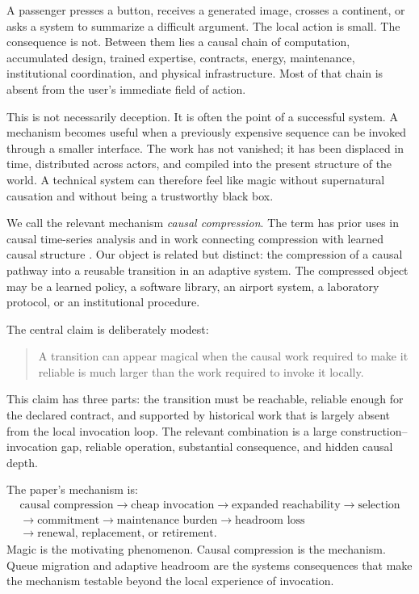 \documentclass[11pt]{article}
\begin{document}
A passenger presses a button, receives a generated image, crosses a continent, or asks a system to summarize a difficult argument. The local action is small. The consequence is not. Between them lies a causal chain of computation, accumulated design, trained expertise, contracts, energy, maintenance, institutional coordination, and physical infrastructure. Most of that chain is absent from the user's immediate field of action.

This is not necessarily deception. It is often the point of a successful system. A mechanism becomes useful when a previously expensive sequence can be invoked through a smaller interface. The work has not vanished; it has been displaced in time, distributed across actors, and compiled into the present structure of the world. A technical system can therefore feel like magic without supernatural causation and without being a trustworthy black box.

We call the relevant mechanism \emph{causal compression}. The term has prior uses in causal time-series analysis \citep{causalcompression2016} and in work connecting compression with learned causal structure \citep{wendong2025}. Our object is related but distinct: the compression of a causal pathway into a reusable transition in an adaptive system. The compressed object may be a learned policy, a software library, an airport system, a laboratory protocol, or an institutional procedure.

The central claim is deliberately modest:

\begin{quote}
A transition can appear magical when the causal work required to make it reliable is much larger than the work required to invoke it locally.
\end{quote}

This claim has three parts: the transition must be reachable, reliable enough for the declared contract, and supported by historical work that is largely absent from the local invocation loop. The relevant combination is a large construction--invocation gap, reliable operation, substantial consequence, and hidden causal depth.

The paper's mechanism is:
\[
\begin{gathered}
\text{causal compression}\rightarrow\text{cheap invocation}\rightarrow\text{expanded reachability}\rightarrow\text{selection}\\
\rightarrow\text{commitment}\rightarrow\text{maintenance burden}\rightarrow\text{headroom loss}\\
\rightarrow\text{renewal, replacement, or retirement}.
\end{gathered}
\]
Magic is the motivating phenomenon. Causal compression is the mechanism. Queue migration and adaptive headroom are the systems consequences that make the mechanism testable beyond the local experience of invocation.
\end{document}
